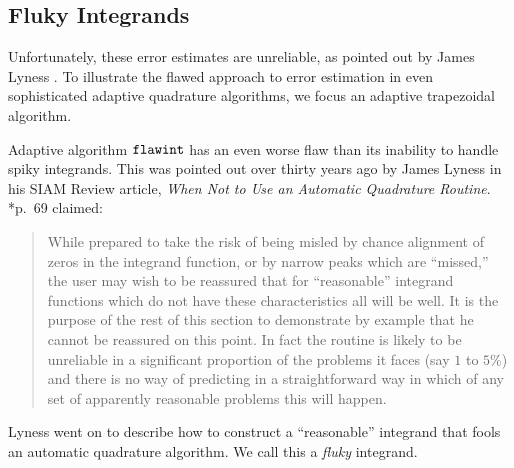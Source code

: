 \documentclass[]{article}
\DeclareMathOperator{\flawinteg}{\texttt{\textup{flawint}}}
\theoremstyle{definition}
\theoremstyle{remark}
\begin{document}
\subsection{Fluky Integrands} \label{flukysubsec}

Unfortunately, these error estimates are unreliable, as pointed out by James Lyness .  To illustrate the flawed approach to error estimation in even sophisticated adaptive quadrature algorithms, we focus an adaptive trapezoidal algorithm.

Adaptive algorithm $\flawinteg$ has an even worse flaw than its inability to handle spiky integrands.  This was pointed out over thirty years ago by James Lyness in his SIAM Review article, \emph{When Not to Use an Automatic Quadrature Routine}.  *{p.\ 69} claimed:
\begin{quote}
While prepared to take the risk of being misled by chance alignment of zeros in the integrand function, or by narrow peaks which are ``missed,'' the user may wish to be reassured that for ``reasonable'' integrand functions which do not have these characteristics all will be well. It is the purpose of the rest of this section to demonstrate by example that he cannot be reassured on this point. In fact the routine is likely to be unreliable in a significant proportion of the problems it faces (say $1$ to $5\%$) and there is no way of predicting in a straightforward way in which of any set of apparently reasonable problems this will happen.
\end{quote}
Lyness went on to describe how to construct a ``reasonable'' integrand that fools an automatic quadrature algorithm.  We call this a \emph{fluky} integrand.  
\end{document}
